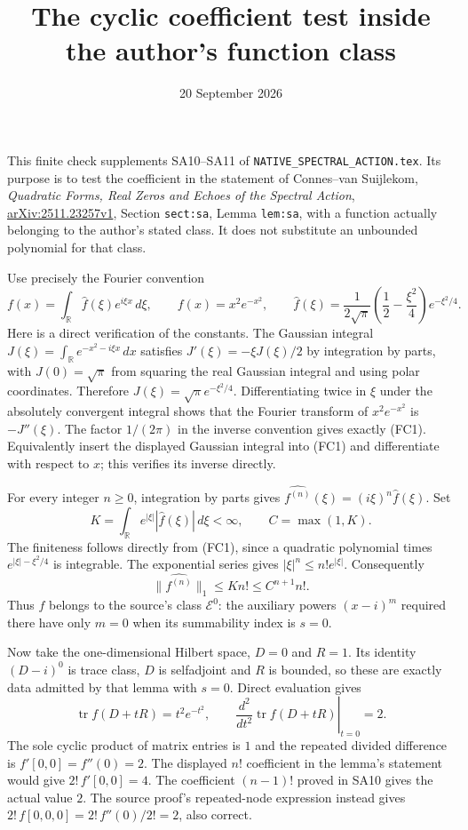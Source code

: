 \documentclass[11pt]{article}
\title{The cyclic coefficient test inside the author's function class}
\author{}\date{20 September 2026}
\begin{document}
\maketitle

This finite check supplements SA10--SA11 of
\texttt{NATIVE\_SPECTRAL\_ACTION.tex}. Its purpose is to test
the coefficient in the statement of Connes--van Suijlekom,
\emph{Quadratic Forms, Real Zeros and Echoes of the Spectral Action},
\href{https://arxiv.org/abs/2511.23257v1}{arXiv:2511.23257v1},
Section \texttt{sect:sa}, Lemma \texttt{lem:sa}, with a
function actually belonging to the author's stated class.
It does not substitute an unbounded polynomial for that class.

Use precisely the Fourier convention
\[
f(x)=\int_{\mathbb R}\widehat f(\xi)e^{i\xi x}\,d\xi,
\qquad
f(x)=x^2e^{-x^2},\qquad
\widehat f(\xi)=\frac1{2\sqrt\pi}
\left(\frac12-\frac{\xi^2}{4}\right)e^{-\xi^2/4}.
\tag{FC1}
\]
Here is a direct verification of the constants.
The Gaussian integral
$J(\xi)=\int_{\mathbb R}e^{-x^2-i\xi x}\,dx$ satisfies
$J'(\xi)=-\xi J(\xi)/2$ by integration by parts, with
$J(0)=\sqrt\pi$ from squaring the real Gaussian integral
and using polar coordinates. Therefore
$J(\xi)=\sqrt\pi e^{-\xi^2/4}$.
Differentiating twice in $\xi$ under the absolutely
convergent integral shows that the Fourier transform
of $x^2e^{-x^2}$ is $-J''(\xi)$.
The factor $1/(2\pi)$ in the inverse convention gives
exactly (FC1). Equivalently insert the displayed
Gaussian integral into (FC1) and differentiate with
respect to $x$; this verifies its inverse directly.

For every integer $n\geq0$, integration by parts gives
$\widehat{f^{(n)}}(\xi)=(i\xi)^n\widehat f(\xi)$.
Set
\[
K=\int_{\mathbb R}e^{|\xi|}|\widehat f(\xi)|\,d\xi<\infty,
\qquad C=\max(1,K).
\tag{FC2}
\]
The finiteness follows directly from (FC1), since a
quadratic polynomial times $e^{|\xi|-\xi^2/4}$ is
integrable. The exponential series gives
$|\xi|^n\leq n!e^{|\xi|}$. Consequently
\[
\|\widehat{f^{(n)}}\|_1
\leq K n!\leq C^{n+1}n!.
\tag{FC3}
\]
Thus $f$ belongs to the source's class $\mathcal E^0$:
the auxiliary powers $(x-i)^m$ required there have
only $m=0$ when its summability index is $s=0$.

Now take the one-dimensional Hilbert space, $D=0$ and
$R=1$. Its identity $(D-i)^0$ is trace class, $D$ is
selfadjoint and $R$ is bounded, so these are exactly
data admitted by that lemma with $s=0$. Direct evaluation
gives
\[
\operatorname{tr}f(D+tR)=t^2e^{-t^2},\qquad
\left.\frac{d^2}{dt^2}\operatorname{tr}f(D+tR)\right|_{t=0}
=2.
\tag{FC4}
\]
The sole cyclic product of matrix entries is $1$ and
the repeated divided difference is
$f'[0,0]=f''(0)=2$.
The displayed $n!$ coefficient in the lemma's statement
would give $2!\,f'[0,0]=4$. The coefficient
$(n-1)!$ proved in SA10 gives the actual value $2$.
The source proof's repeated-node expression instead
gives $2!\,f[0,0,0]=2!\,f''(0)/2!=2$, also correct.
\end{document}
